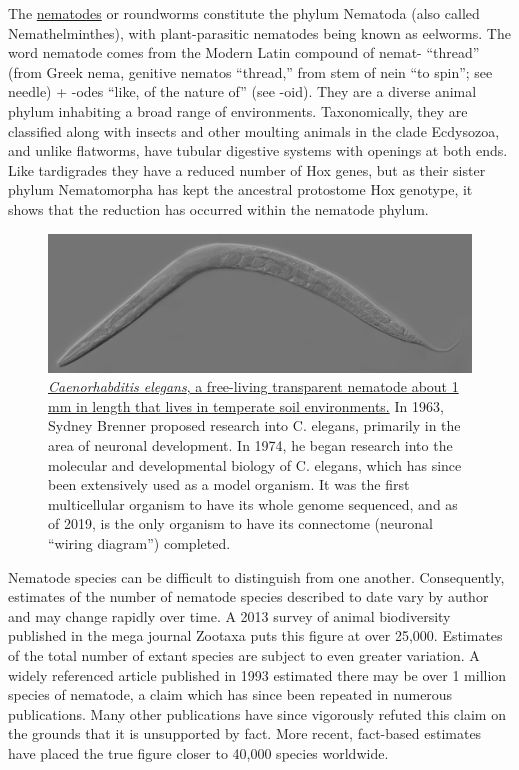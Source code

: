 The \href{https://en.wikipedia.org/wiki/Nematode}{nematodes} or roundworms constitute the phylum Nematoda (also called Nemathelminthes), with plant-parasitic nematodes being known as eelworms. The word nematode comes from the Modern Latin compound of nemat- ``thread'' (from Greek nema, genitive nematos ``thread,'' from stem of nein ``to spin''; see needle) + -odes ``like, of the nature of'' (see -oid). They are a diverse animal phylum inhabiting a broad range of environments. Taxonomically, they are classified along with insects and other moulting animals in the clade Ecdysozoa, and unlike flatworms, have tubular digestive systems with openings at both ends. Like tardigrades they have a reduced number of Hox genes, but as their sister phylum Nematomorpha has kept the ancestral protostome Hox genotype, it shows that the reduction has occurred within the nematode phylum.



\begin{figure}

{\centering \includegraphics[width=0.7\linewidth]{./figures/animals/Adult_Caenorhabditis_elegans} 

}

\caption{\href{https://commons.wikimedia.org/wiki/File:Adult_Caenorhabditis_elegans.jpg}{\emph{Caenorhabditis elegans}, a free-living transparent nematode about 1 mm in length that lives in temperate soil environments.} In 1963, Sydney Brenner proposed research into C. elegans, primarily in the area of neuronal development. In 1974, he began research into the molecular and developmental biology of C. elegans, which has since been extensively used as a model organism. It was the first multicellular organism to have its whole genome sequenced, and as of 2019, is the only organism to have its connectome (neuronal ``wiring diagram'') completed.}\label{fig:celegans}
\end{figure}

Nematode species can be difficult to distinguish from one another. Consequently, estimates of the number of nematode species described to date vary by author and may change rapidly over time. A 2013 survey of animal biodiversity published in the mega journal Zootaxa puts this figure at over 25,000. Estimates of the total number of extant species are subject to even greater variation. A widely referenced article published in 1993 estimated there may be over 1 million species of nematode, a claim which has since been repeated in numerous publications. Many other publications have since vigorously refuted this claim on the grounds that it is unsupported by fact. More recent, fact-based estimates have placed the true figure closer to 40,000 species worldwide.


